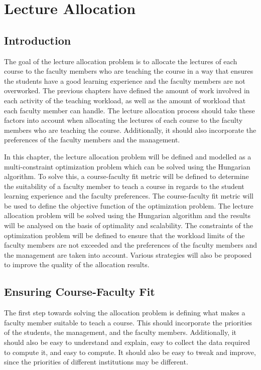 
\chapter{Lecture Allocation}

\section{Introduction}

The goal of the lecture allocation problem is to allocate the lectures of each course to the faculty members who are teaching the course in a way that ensures the students have a good learning experience and the faculty members are not overworked. The previous chapters have defined the amount of work involved in each activity of the teaching workload, as well as the amount of workload that each faculty member can handle. The lecture allocation process should take these factors into account when allocating the lectures of each course to the faculty members who are teaching the course. Additionally, it should also incorporate the preferences of the faculty members and the management.

In this chapter, the lecture allocation problem will be defined and modelled as a multi-constraint optimization problem which can be solved using the Hungarian algorithm. To solve this, a course-faculty fit metric will be defined to determine the suitability of a faculty member to teach a course in regards to the student learning experience and the faculty preferences. The course-faculty fit metric will be used to define the objective function of the optimization problem. The lecture allocation problem will be solved using the Hungarian algorithm and the results will be analysed on the basis of optimality and scalability. The constraints of the optimization problem will be defined to ensure that the workload limits of the faculty members are not exceeded and the preferences of the faculty members and the management are taken into account. Various strategies will also be proposed to improve the quality of the allocation results.

\section{Ensuring Course-Faculty Fit}

The first step towards solving the allocation problem is defining what makes a faculty member suitable to teach a course. This should incorporate the priorities of the students, the management, and the faculty members. Additionally, it should also be easy to understand and explain, easy to collect the data required to compute it, and easy to compute. It should also be easy to tweak and improve, since the priorities of different institutions may be different.



